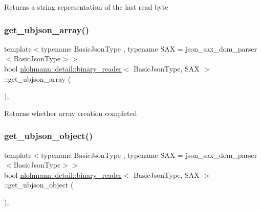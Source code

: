 \begin{DoxyReturn}{Returns}
a string representation of the last read byte 
\end{DoxyReturn}
\mbox{\label{classnlohmann_1_1detail_1_1binary__reader_a4e8ef9561d4403ea68e3c2712fd289e2}} 
\subsubsection{\texorpdfstring{get\+\_\+ubjson\+\_\+array()}{get\_ubjson\_array()}}
{\footnotesize\ttfamily template$<$typename Basic\+Json\+Type , typename S\+AX  = json\+\_\+sax\+\_\+dom\+\_\+parser$<$\+Basic\+Json\+Type$>$$>$ \\
bool \hyperlink{classnlohmann_1_1detail_1_1binary__reader}{nlohmann\+::detail\+::binary\+\_\+reader}$<$ Basic\+Json\+Type, S\+AX $>$\+::get\+\_\+ubjson\+\_\+array (\begin{DoxyParamCaption}{ }\end{DoxyParamCaption})\hspace{0.3cm}{\ttfamily [inline]}, {\ttfamily [private]}}

\begin{DoxyReturn}{Returns}
whether array creation completed 
\end{DoxyReturn}
\mbox{\label{classnlohmann_1_1detail_1_1binary__reader_ad0932dd568fcbbd2b4c2ccf9122544a5}} 
\subsubsection{\texorpdfstring{get\+\_\+ubjson\+\_\+object()}{get\_ubjson\_object()}}
{\footnotesize\ttfamily template$<$typename Basic\+Json\+Type , typename S\+AX  = json\+\_\+sax\+\_\+dom\+\_\+parser$<$\+Basic\+Json\+Type$>$$>$ \\
bool \hyperlink{classnlohmann_1_1detail_1_1binary__reader}{nlohmann\+::detail\+::binary\+\_\+reader}$<$ Basic\+Json\+Type, S\+AX $>$\+::get\+\_\+ubjson\+\_\+object (\begin{DoxyParamCaption}{ }\end{DoxyParamCaption})\hspace{0.3cm}{\ttfamily [inline]}, {\ttfamily [private]}}

